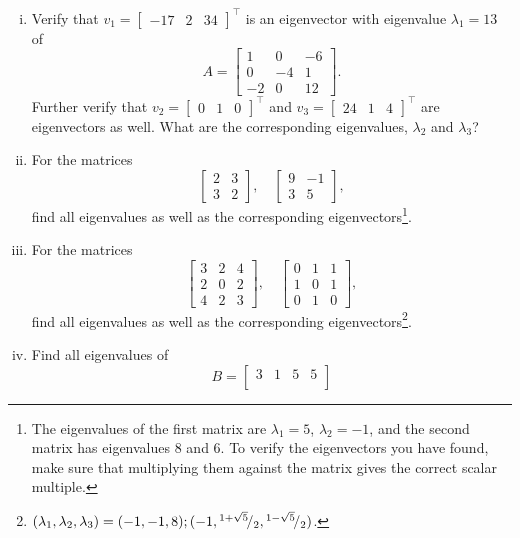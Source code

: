 \begin{exercise}
\label{excs:evals}
\begin{enumerate}[(i)]
	\item Verify that $v_1=\begin{bmatrix} -17 & 2 & 34	\end{bmatrix}^\top$ is an eigenvector with eigenvalue $\lambda_1=13$ of
	\[  A = \begin{bmatrix}	1 & 0 & -6 \\ 0 & -4 & 1 \\ -2 & 0 & 12 \end{bmatrix}. \]
	Further verify that $v_2 = \begin{bmatrix} 0 & 1 & 0 \end{bmatrix}^\top$ and $v_3 = \begin{bmatrix} 24 & 1 & 4 \end{bmatrix}^\top$ are eigenvectors as well. What are the corresponding eigenvalues, $\lambda_2$ and $\lambda_3$?
	\item For the matrices
	\[  \begin{bmatrix} 2 & 3 \\ 3 & 2 \end{bmatrix}, \quad 
	\begin{bmatrix} 9 & -1 \\ 3 & 5	\end{bmatrix}, \]
	find all eigenvalues as well as the corresponding eigenvectors\footnote{The eigenvalues of the first matrix are $\lambda_1=5$, $\lambda_2=-1$, and the second matrix has eigenvalues $8$ and $6$. To verify the eigenvectors you have found, make sure that multiplying them against the matrix gives the correct scalar multiple.}.
	\item For the matrices
	\[  \begin{bmatrix} 3 & 2 & 4\\ 2 & 0 & 2 \\ 4 & 2 & 3 \end{bmatrix}, \quad 
	\begin{bmatrix} 0 & 1 & 1\\ 1 & 0 & 1 \\ 0 & 1 & 0 \end{bmatrix}, \]
	find all eigenvalues as well as the corresponding eigenvectors\footnote{$(\lambda_1,\lambda_2,\lambda_3)=(-1,-1,8);(-1,{}^{1+\sqrt{5}}\!/_{2},{}^{1-\sqrt{5}}\!/_{2})$.}.
	\item Find all eigenvalues of
	\[ B = \begin{bmatrix}
	3 &  1 &  5 &  5 \\ 

\end{bmatrix}\]
\end{enumerate}
\end{exercise}
